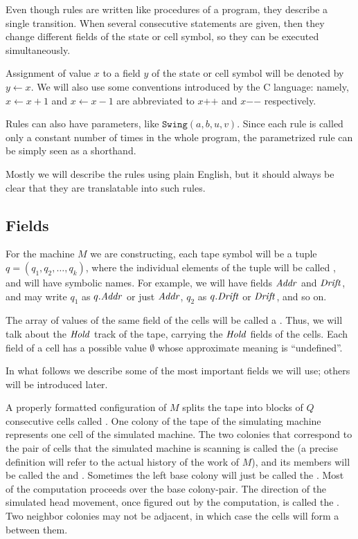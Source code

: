 \documentclass[11pt]{memoir}
\theoremstyle{definition} %
\newcommand{\fld}[1]{\ensuremath{\textit{#1\/}}}
\newcommand{\rul}[1]{\ensuremath{\texttt{#1}}}
\newcommand{\Q}{Q}
\newcommand{\Addr}{\fld{Addr}}
\newcommand{\Drift}{\fld{Drift}}
\newcommand{\Hold}{\fld{Hold}}
\newcommand{\increment}[1]{#1\mathord{+}\mathord{+}}
\newcommand{\decrement}[1]{#1\mathord{-}\mathord{-}}
\newcommand{\ruSwing}{\rul{Swing}}
\begin{document}
Even though rules are written like procedures of a program,
they describe a single transition.
When several consecutive statements are given, then they
change different fields of the state or
cell symbol, so they can be executed simultaneously.

Assignment of value \( x \) to a field \( y \) of the state or cell symbol will
be denoted by \( y \gets x \).
We will also use some conventions introduced by the C language:
namely,
\( x\gets x+1 \) and \( x\gets x-1 \) are abbreviated to \( \increment{x} \) and
\( \decrement{x} \) respectively.

Rules can also have parameters, like \( \ruSwing(a,b,u,v) \).
Since each rule is called only a constant number of times in the whole program,
the parametrized rule can be simply seen as a shorthand.

Mostly we will describe
the rules using plain English, but it should always be clear that they
are translatable into such rules.


\subsection{Fields}\label{sec:fields}

\begin{sloppypar}
For the machine \( M \) we are constructing, each tape symbol will 
be a tuple \( q=(q_{1},q_{2},\dots,q_{k}) \),
where the individual elements of the tuple will be called , and will
have symbolic names.
For example, we will have fields \( \Addr \) and \( \Drift \),
and may write \( q_{1} \) as \( q.\Addr \) or just \( \Addr \), 
\( q_{2} \) as \( q.\Drift \) or \( \Drift \), and so on.
\end{sloppypar}

The array of values of the same field of the cells will be called a .
Thus, we will talk about the \( \Hold \) track of the tape, carrying the
\( \Hold \) fields of the cells.
 Each field of a cell has a possible value
\( \emptyset \) whose approximate meaning is ``undefined''.

In what follows we describe some of the most important fields we will use;
others will be introduced later.

A properly formatted configuration of \( M \) splits the tape into blocks of \( \Q \)
consecutive cells called .
One colony of the tape of the simulating
machine represents one cell of the simulated machine.
The two colonies that correspond to the pair of cells that the
simulated machine is scanning is called the 
(a precise definition will refer to the actual history of the work of \( M \)), and its
members will be called the  and .
Sometimes the left base colony will just be called the .
Most of the computation proceeds over the base colony-pair.
The direction of the simulated head movement, once figured out by the computation,
is called the .
Two neighbor colonies may not be adjacent, in which case the cells will form
a  between them.
\end{document}
